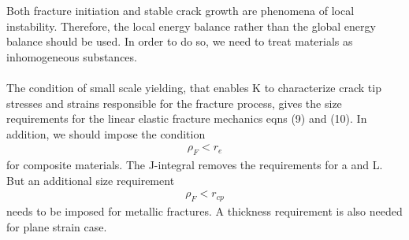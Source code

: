 \documentclass[12pt]{article}
\begin{document}
Both fracture initiation and stable crack growth are phenomena of local instability. Therefore, the
local energy balance rather than the global energy balance should be used. In order to do so, we need to
treat materials as inhomogeneous substances.
\\\\
The condition of small scale yielding, that enables K to characterize crack tip stresses and strains
responsible for the fracture process, gives the size requirements for the linear elastic fracture mechanics
eqns (9) and (10). In addition, we should impose the condition
\begin{align*}
    \rho_F < r_e \tag{11} \label{11}
\end{align*}
for composite materials. The J-integral removes the requirements for a and L. But an additional size
requirement
\begin{align*}
    \rho_F < r_{cp} \tag{12} \label{12}
\end{align*}
needs to be imposed for metallic fractures. A thickness requirement is also needed for plane strain case.
\end{document}
